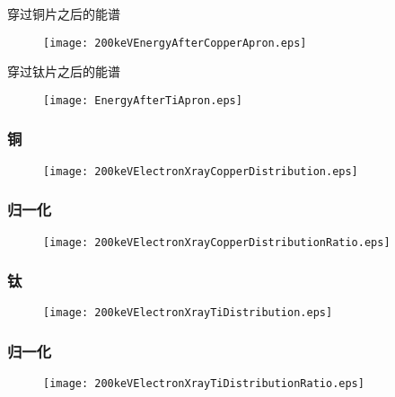 \documentclass{beamer}
\begin{document}
\begin{CJK*}{UTF8}{gkai}
\begin{frame}{穿过铜片之后的能谱}
  \begin{figure}[ht]
    \texttt{[image: 200keVEnergyAfterCopperApron.eps]}
  \end{figure}
\end{frame}
\begin{frame}{穿过钛片之后的能谱}
  \begin{figure}[ht]
    \texttt{[image: EnergyAfterTiApron.eps]}
  \end{figure}
\end{frame}

\begin{frame}\frametitle{铜}
  \begin{figure}[ht]
    \texttt{[image: 200keVElectronXrayCopperDistribution.eps]}
  \end{figure}
\end{frame}
\begin{frame}\frametitle{归一化}
  \begin{figure}[ht]
    \texttt{[image: 200keVElectronXrayCopperDistributionRatio.eps]}
  \end{figure}
\end{frame}
\begin{frame}\frametitle{钛}
  \begin{figure}[ht]
    \texttt{[image: 200keVElectronXrayTiDistribution.eps]}
  \end{figure}
\end{frame}
\begin{frame}\frametitle{归一化}
  \begin{figure}[ht]
    \texttt{[image: 200keVElectronXrayTiDistributionRatio.eps]}
  \end{figure}
\end{frame}

\end{CJK*}
\end{document}

